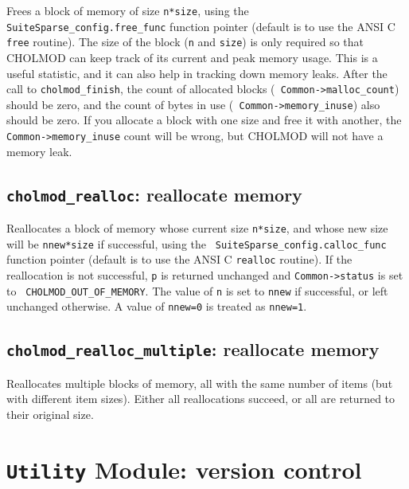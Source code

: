 \documentclass[11pt]{article}
\begin{document}

Frees a block of memory of size {\tt n*size}, using the {\tt
SuiteSparse\_config.free\_func} function pointer (default is to use the ANSI C
{\tt free} routine).  The size of the block ({\tt n} and {\tt size}) is only
required so that CHOLMOD can keep track of its current and peak memory usage.
This is a useful statistic, and it can also help in tracking down memory leaks.
After the call to {\tt cholmod\_finish}, the count of allocated blocks ({\tt
Common->malloc\_count}) should be zero, and the count of bytes in use ({\tt
Common->memory\_inuse}) also should be zero.  If you allocate a block with one
size and free it with another, the {\tt Common->memory\_inuse} count will be
wrong, but CHOLMOD will not have a memory leak.

\subsection{{\tt cholmod\_realloc}: reallocate memory}


Reallocates a block of memory whose current size {\tt n*size}, and whose new
size will be {\tt nnew*size} if successful, using the {\tt
SuiteSparse\_config.calloc\_func} function pointer (default is to use the ANSI
C {\tt realloc} routine).  If the reallocation is not successful, {\tt p} is
returned unchanged and {\tt Common->status} is set to {\tt
CHOLMOD\_OUT\_OF\_MEMORY}.  The value of {\tt n} is set to {\tt nnew} if
successful, or left unchanged otherwise.  A value of {\tt nnew=0} is treated as
{\tt nnew=1}.

\subsection{{\tt cholmod\_realloc\_multiple}: reallocate memory}


Reallocates multiple blocks of memory, all with the same number of items (but
with different item sizes).  Either all reallocations succeed, or all are
returned to their original size.

\newpage \section{{\tt Utility} Module: version control}
\end{document}
